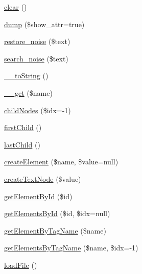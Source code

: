 \begin{DoxyCompactItemize}
\item 
\hyperlink{classsimple__html__dom_aa821bec12eaa7e0f649397c9675ff505}{clear} ()
\item 
\hyperlink{classsimple__html__dom_ad2a305d3f759f9c444d5b2e686586598}{dump} (\$show\+\_\+attr=true)
\item 
\hyperlink{classsimple__html__dom_a65768af772cc55c11fc85d4d8697140e}{restore\+\_\+noise} (\$text)
\item 
\hyperlink{classsimple__html__dom_a7bcdfb5fa10cf704553ff32f5f5d693f}{search\+\_\+noise} (\$text)
\item 
\hyperlink{classsimple__html__dom_a7516ca30af0db3cdbf9a7739b48ce91d}{\+\_\+\+\_\+to\+String} ()
\item 
\hyperlink{classsimple__html__dom_abc8e9e31bb15c8a44c3210ec551407c8}{\+\_\+\+\_\+get} (\$name)
\item 
\hyperlink{classsimple__html__dom_a543b9f022b4d71d19a8f055b3b87bb77}{child\+Nodes} (\$idx=-\/1)
\item 
\hyperlink{classsimple__html__dom_a2e7ff3e4db465652634f86004ccb83db}{first\+Child} ()
\item 
\hyperlink{classsimple__html__dom_aa290d153aa9b41988d2b4bfb23424241}{last\+Child} ()
\item 
\hyperlink{classsimple__html__dom_a00ba25421a388987512a3859ff7c2ad9}{create\+Element} (\$name, \$value=null)
\item 
\hyperlink{classsimple__html__dom_af9ee904e108e5c1956eec226881a9442}{create\+Text\+Node} (\$value)
\item 
\hyperlink{classsimple__html__dom_aec6ca41b9859728595ece521ca638e48}{get\+Element\+By\+Id} (\$id)
\item 
\hyperlink{classsimple__html__dom_a12433180a44804217a6089284c1e337a}{get\+Elements\+By\+Id} (\$id, \$idx=null)
\item 
\hyperlink{classsimple__html__dom_a73eb6caf89c86044a5ed0092484f375d}{get\+Element\+By\+Tag\+Name} (\$name)
\item 
\hyperlink{classsimple__html__dom_a3f59e79eb934dd4d4ef322f20d368849}{get\+Elements\+By\+Tag\+Name} (\$name, \$idx=-\/1)
\item 
\hyperlink{classsimple__html__dom_a4ab90327dc2941e600549ddf19e75bbd}{load\+File} ()
\end{DoxyCompactItemize}
